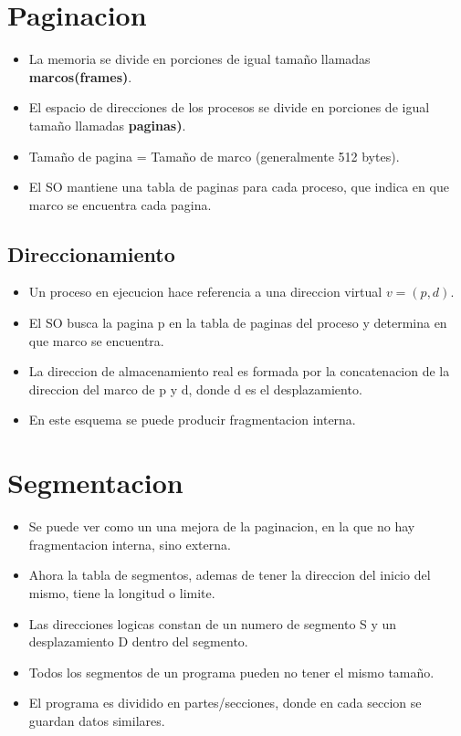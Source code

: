 \documentclass[12pt]{article}
\begin{document}
\section{Paginacion}
\begin{itemize}
    \item La memoria se divide en porciones de igual tamaño llamadas \textbf{marcos(frames)}.
    \item El espacio de direcciones de los procesos se divide en porciones de igual tamaño llamadas \textbf{paginas)}.
    \item Tamaño de pagina = Tamaño de marco (generalmente 512 bytes).
    \item El SO mantiene una tabla de paginas para cada proceso, que indica en que marco se encuentra cada pagina.
\end{itemize}
\subsection{Direccionamiento}
\begin{itemize}
    \item Un proceso en ejecucion hace referencia a una direccion virtual $v=(p,d)$.
    \item El SO busca la pagina p en la tabla de paginas del proceso y determina en que marco se encuentra.
    \item La direccion de almacenamiento real es formada por la concatenacion de la direccion del marco de p y d, donde d es el desplazamiento.
    \item En este esquema se puede producir fragmentacion interna.
\end{itemize}

\section{Segmentacion}
\begin{itemize}
    \item Se puede ver como un una mejora de la paginacion, en la que no hay fragmentacion interna, sino externa.
    \item Ahora la tabla de segmentos, ademas de tener la direccion del inicio del mismo, tiene la longitud o limite.
    \item Las direcciones logicas constan de un numero de segmento S y un desplazamiento D dentro del segmento.
    \item Todos los segmentos de un programa pueden no tener el mismo tamaño.
    \item El programa es dividido en partes/secciones, donde en cada seccion se guardan datos similares.
\end{itemize}
\end{document}
